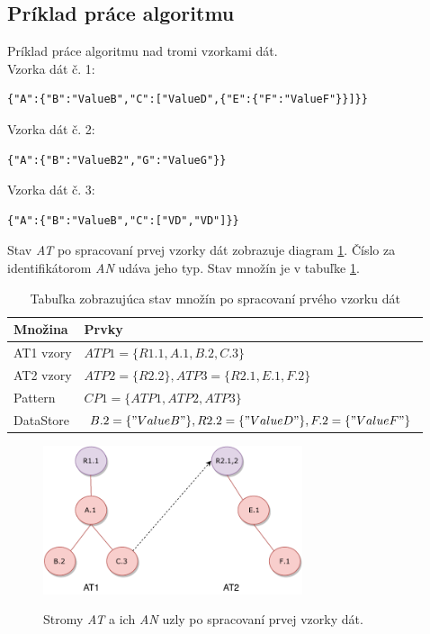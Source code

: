 \subsection*{Príklad práce algoritmu} 
Príklad práce algoritmu nad tromi vzorkami dát.\\
Vzorka dát č. 1:
\begin{lstlisting}
{"A":{"B":"ValueB","C":["ValueD",{"E":{"F":"ValueF"}}]}}
\end{lstlisting}
Vzorka dát č. 2:
\begin{lstlisting}
{"A":{"B":"ValueB2","G":"ValueG"}}
\end{lstlisting}
Vzorka dát č. 3:
\begin{lstlisting}
{"A":{"B":"ValueB","C":["VD","VD"]}}
\end{lstlisting}
Stav \textit{AT} po spracovaní prvej vzorky dát zobrazuje diagram \ref{alg_example1_img}. Číslo za identifikátorom \textit{AN} udáva jeho typ. Stav množín je v tabuľke \ref{alg_example1_tab}.
\begin{table}[hbt]
	\centering
	\label{alg_example1_tab}
	\begin{tabular}{|p{1.8cm}|p{12cm}|}
		\hline
		\textbf{Množina} & \textbf{Prvky} \\ \hline
		AT1 vzory & 	\(ATP1 = \{R1.1, A.1, B.2, C.3\}\) \\ \hline
		AT2 vzory & 	\(ATP2 = \{R2.2\}, ATP3 = \{R2.1, E.1, F.2 \}  \)   \\ \hline		
		Pattern & 	\(CP1 = \{ATP1, ATP2, ATP3\}  \)   \\ \hline
		DataStore & 	\(B.2 = \{"ValueB"\}, R2.2 = \{"ValueD"\}, F.2 = \{"ValueF"\}  \)   \\ \hline						

	\end{tabular}
	\caption{Tabuľka zobrazujúca stav množín po spracovaní prvého vzorku dát}
\end{table} 
\begin{figure}[h]\centering
	\centering
	\includegraphics[width=3.0in,keepaspectratio]{obrazky-figures/alg_example1.pdf}\\[1pt]
	\caption{Stromy \textit{AT} a ich \textit{AN} uzly po spracovaní prvej vzorky dát.}
	\label{alg_example1_img}
\end{figure} 

